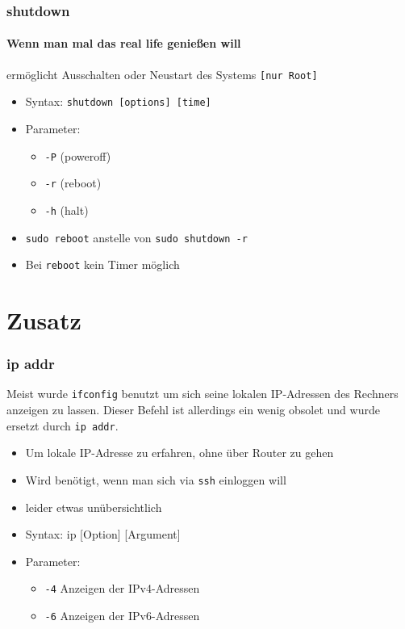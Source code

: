 \documentclass[12pt,utf8, handout]{beamer}
\begin{document}
\begin{frame}
\frametitle{shutdown}
\framesubtitle{\textcolor{ownDarkOr}{Wenn man mal das real life genießen will}}
ermöglicht Ausschalten oder Neustart des Systems \texttt{[nur Root]}
\begin{itemize}[<+->]
	\item Syntax: \texttt{shutdown [options] [time]}
	\item Parameter:
	\begin{itemize}[<+->]
		\item \texttt{-P} (poweroff)
		\item \texttt{-r} (reboot) 
		\item \texttt{-h} (halt)
	\end{itemize}
	\item \texttt{sudo reboot} anstelle von \texttt{sudo shutdown -r}
	\item Bei \texttt{reboot} kein Timer möglich
\end{itemize}
\end{frame}

\section{Zusatz}
\begin{frame}
\frametitle{ip addr}
Meist wurde \texttt{ifconfig} benutzt um sich seine lokalen IP-Adressen des Rechners anzeigen zu lassen. Dieser Befehl ist allerdings ein wenig obsolet und wurde ersetzt durch \texttt{ip addr}.
\begin{itemize}
	\item Um lokale IP-Adresse zu erfahren, ohne über Router zu gehen
	\item Wird benötigt, wenn man sich via \texttt{ssh} einloggen will
	\item leider etwas unübersichtlich
	\item Syntax: ip [Option] [Argument]
	\item Parameter:
	\begin{itemize}
		\item \texttt{-4} Anzeigen der IPv4-Adressen
		\item \texttt{-6} Anzeigen der IPv6-Adressen
	\end{itemize}
\end{itemize}
\end{frame}
\end{document}
